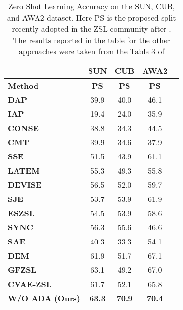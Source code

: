 \documentclass[10pt,twocolumn,letterpaper]{article}
\begin{document}
\begin{table}[h!]
\small
 \centering
 \addtolength{\tabcolsep}{5pt}
 \begin{tabular}{|l| c |c | c | c |} 
 \hline
  & {\textbf{SUN}} & {\textbf{CUB}} &  {\textbf{AWA2}} \\ \hline
 \textbf{Method} &  \textbf{PS} &   \textbf{PS} &  \textbf{PS} \\ 
  \hline
 \textbf{DAP}\cite{DAP} & 39.9  & 40.0    & 46.1 \\
 \textbf{IAP} \cite{IAP}  & 19.4  & 24.0    & 35.9\\
 \textbf{CONSE} \cite{norouzi2013zero} &  38.8 &  34.3   & 44.5 \\
 \textbf{CMT} \cite{cmt}  & 39.9  & 34.6 &  37.9 \\
  \textbf{SSE} \cite{saligram2016learningJoint}  & 51.5  & 43.9 & 61.1\\
  \textbf{LATEM} \cite{latem}  & 55.3  & 49.3    & 55.8\\
\textbf{DEVISE} \cite{frome2013devise}  & 56.5 & 52.0 & 59.7 \\
 \textbf{SJE} \cite{SJE}  & 53.7  & 53.9 &  61.9 \\
 \textbf{ESZSL} \cite{ESZSL2015} & 54.5  & 53.9   & 58.6 \\
 \textbf{SYNC}\cite{changpinyo2016synthesized}  & 56.3  & 55.6  & 46.6\\
 \textbf{SAE} \cite{SAE2017}  & 40.3  & 33.3  & 54.1 \\
 \textbf{DEM} \cite{dem}  & 61.9  & 51.7  &  67.1 \\

\textbf{GFZSL}\cite{verma2017simple}  & 63.1  & 49.2   & 67.0 \\
 \textbf{CVAE-ZSL}\cite{mishra2017generative}  & 61.7  & 52.1  &  65.8 \\
\hline
 \textbf{W/O ADA (Ours)} & \textbf{63.3} & \textbf{70.9}  &  \textbf{70.4} \\
\hline
 \end{tabular}
 \caption{Zero Shot Learning Accuracy on the SUN, CUB, and AWA2 dataset. Here PS is the proposed split recently adopted in the ZSL community after \cite{xian2018zero}. The results reported in the table for the other approaches were taken from the Table 3 of \cite{xian2018zero} }
 \label{tab:zsl} 
 \vspace{-1em}
\end{table}
\end{document}
